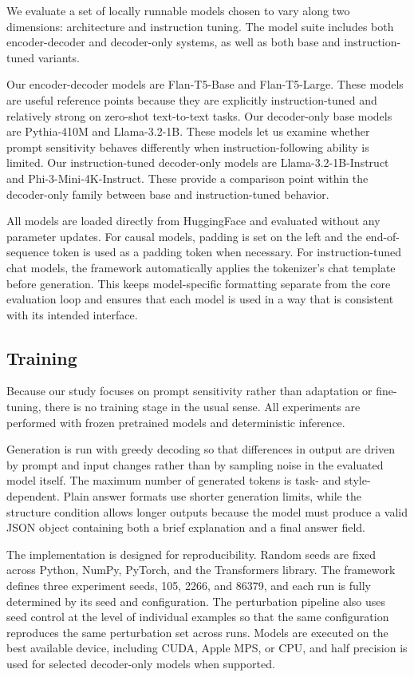 \documentclass[11pt]{article}
\begin{document}
We evaluate a set of locally runnable models chosen to vary along two dimensions: architecture and instruction tuning. The model suite includes both encoder-decoder and decoder-only systems, as well as both base and instruction-tuned variants.

Our encoder-decoder models are Flan-T5-Base and Flan-T5-Large. These models are useful reference points because they are explicitly instruction-tuned and relatively strong on zero-shot text-to-text tasks. Our decoder-only base models are Pythia-410M and Llama-3.2-1B. These models let us examine whether prompt sensitivity behaves differently when instruction-following ability is limited. Our instruction-tuned decoder-only models are Llama-3.2-1B-Instruct and Phi-3-Mini-4K-Instruct. These provide a comparison point within the decoder-only family between base and instruction-tuned behavior.

All models are loaded directly from HuggingFace and evaluated without any parameter updates. For causal models, padding is set on the left and the end-of-sequence token is used as a padding token when necessary. For instruction-tuned chat models, the framework automatically applies the tokenizer's chat template before generation. This keeps model-specific formatting separate from the core evaluation loop and ensures that each model is used in a way that is consistent with its intended interface.

\subsection{Training}

Because our study focuses on prompt sensitivity rather than adaptation or fine-tuning, there is no training stage in the usual sense. All experiments are performed with frozen pretrained models and deterministic inference.

Generation is run with greedy decoding so that differences in output are driven by prompt and input changes rather than by sampling noise in the evaluated model itself. The maximum number of generated tokens is task- and style-dependent. Plain answer formats use shorter generation limits, while the structure condition allows longer outputs because the model must produce a valid JSON object containing both a brief explanation and a final answer field.

The implementation is designed for reproducibility. Random seeds are fixed across Python, NumPy, PyTorch, and the Transformers library. The framework defines three experiment seeds, 105, 2266, and 86379, and each run is fully determined by its seed and configuration. The perturbation pipeline also uses seed control at the level of individual examples so that the same configuration reproduces the same perturbation set across runs. Models are executed on the best available device, including CUDA, Apple MPS, or CPU, and half precision is used for selected decoder-only models when supported.
\end{document}
